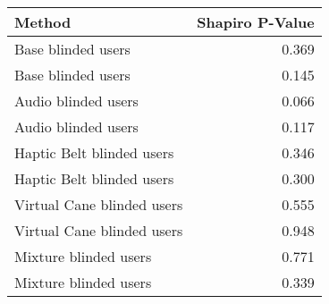 
\centering
\begin{tabular}{lr}
\toprule
                    Method &  Shapiro P-Value \\
\midrule
        Base blinded users &            0.369 \\
        Base blinded users &            0.145 \\
       Audio blinded users &            0.066 \\
       Audio blinded users &            0.117 \\
 Haptic Belt blinded users &            0.346 \\
 Haptic Belt blinded users &            0.300 \\
Virtual Cane blinded users &            0.555 \\
Virtual Cane blinded users &            0.948 \\
     Mixture blinded users &            0.771 \\
     Mixture blinded users &            0.339 \\
\bottomrule
\end{tabular}
